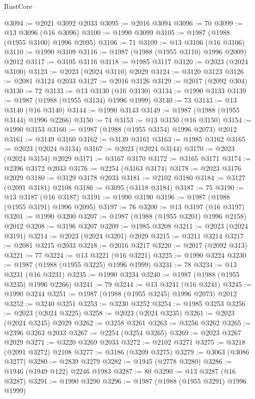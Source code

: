 \begin{lexlean}{RustCore}
\begin{coremodule}
@3094 := @2021 @3092 @2033
@3095 := @2016 @3094
@3096 := 70
@3099 := @13 @3096 (@16 @3096)
@3100 := @1990 @3099
@3105 := @1987 (@1988 (@1955 @3100) @1996 @2095)
@3106 := 71
@3109 := @13 @3106 (@16 @3106)
@3110 := @1990 @3109
@3116 := @1987 (@1988 (@1955 @3110) @1996 @2009) @2012
@3117 := @3105 @3116
@3118 := @1985 @3117
@3120 := @2023 (@2024 @3100)
@3123 := @2023 (@2024 @3110) @2029
@3124 := @3120 @3123
@3126 := @2081 @3124 @2033
@3127 := @2016 @3126
@3129 := @2017 (@2092 @304)
@3130 := 72
@3133 := @13 @3130 (@16 @3130)
@3134 := @1990 @3133
@3139 := @1987 (@1988 (@1955 @3134) @1996 @1999)
@3140 := 73
@3143 := @13 @3140 (@16 @3140)
@3144 := @1990 @3143
@3149 := @1987 (@1988 (@1955 @3144) @1996 @2266)
@3150 := 74
@3153 := @13 @3150 (@16 @3150)
@3154 := @1990 @3153
@3160 := @1987 (@1988 (@1955 @3154) @1996 @2073) @2012
@3161 := @3149 @3160
@3162 := @3139 @3161
@3163 := @1985 @3162
@3165 := @2023 (@2024 @3134)
@3167 := @2023 (@2024 @3144)
@3170 := @2023 (@2024 @3154) @2029
@3171 := @3167 @3170
@3172 := @3165 @3171
@3174 := @2396 @3172 @2033
@3176 := @2254 (@3163 @3174)
@3178 := @2023 @3176 @2029
@3180 := @3129 @3178 @2033
@3181 := @2102 @3180
@3184 := @3127 (@2091 @3181) @2108
@3186 := @3095 (@3118 @3184)
@3187 := 75
@3190 := @13 @3187 (@16 @3187)
@3191 := @1990 @3190
@3196 := @1987 (@1988 (@1955 @3191) @1996 @2095)
@3197 := 76
@3200 := @13 @3197 (@16 @3197)
@3201 := @1990 @3200
@3207 := @1987 (@1988 (@1955 @3201) @1996 @2158) @2012
@3208 := @3196 @3207
@3209 := @1985 @3208
@3211 := @2023 (@2024 @3191)
@3214 := @2023 (@2024 @3201) @2029
@3215 := @3211 @3214
@3217 := @2081 @3215 @2033
@3218 := @2016 @3217
@3220 := @2017 (@2092 @313)
@3221 := 77
@3224 := @13 @3221 (@16 @3221)
@3225 := @1990 @3224
@3230 := @1987 (@1988 (@1955 @3225) @1996 @1999)
@3231 := 78
@3234 := @13 @3231 (@16 @3231)
@3235 := @1990 @3234
@3240 := @1987 (@1988 (@1955 @3235) @1996 @2266)
@3241 := 79
@3244 := @13 @3241 (@16 @3241)
@3245 := @1990 @3244
@3251 := @1987 (@1988 (@1955 @3245) @1996 @2073) @2012
@3252 := @3240 @3251
@3253 := @3230 @3252
@3254 := @1985 @3253
@3256 := @2023 (@2024 @3225)
@3258 := @2023 (@2024 @3235)
@3261 := @2023 (@2024 @3245) @2029
@3262 := @3258 @3261
@3263 := @3256 @3262
@3265 := @2396 @3263 @2033
@3267 := @2254 (@3254 @3265)
@3269 := @2023 @3267 @2029
@3271 := @3220 @3269 @2033
@3272 := @2102 @3271
@3275 := @3218 (@2091 @3272) @2108
@3277 := @3186 (@3209 @3275)
@3279 := @3063 (@3086 @3277)
@3280 := @2839 @3279
@3282 := @1945 (@2778 @3280)
@3286 := @1946 (@1949 @122) @2246 @1983
@3287 := 80
@3290 := @13 @3287 (@16 @3287)
@3291 := @1990 @3290
@3296 := @1987 (@1988 (@1955 @3291) @1996 @1999)

\end{coremodule}
\end{lexlean}

